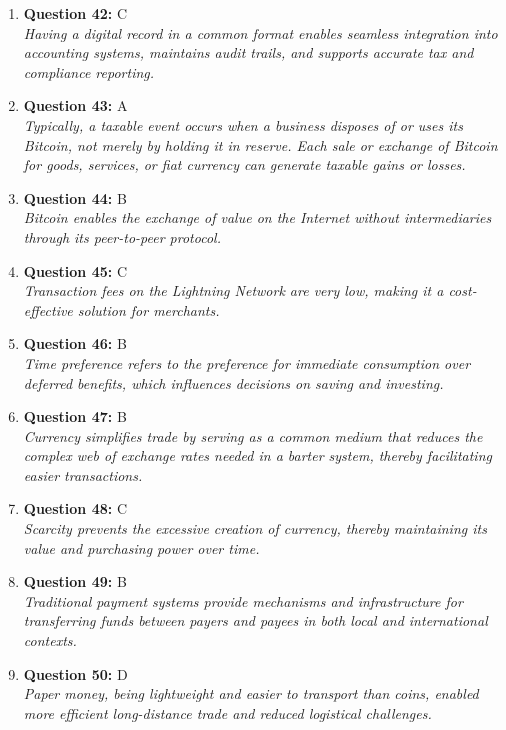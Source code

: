 \documentclass[12pt,a4paper]{article}
\begin{document}
\begin{enumerate}
\item \textbf{Question 42:} C
\\ \textit{Having a digital record in a common format enables seamless integration into accounting systems, maintains audit trails, and supports accurate tax and compliance reporting.}

\item \textbf{Question 43:} A
\\ \textit{Typically, a taxable event occurs when a business disposes of or uses its Bitcoin, not merely by holding it in reserve. Each sale or exchange of Bitcoin for goods, services, or fiat currency can generate taxable gains or losses.}

\item \textbf{Question 44:} B
\\ \textit{Bitcoin enables the exchange of value on the Internet without intermediaries through its peer-to-peer protocol.}

\item \textbf{Question 45:} C
\\ \textit{Transaction fees on the Lightning Network are very low, making it a cost-effective solution for merchants.}

\item \textbf{Question 46:} B
\\ \textit{Time preference refers to the preference for immediate consumption over deferred benefits, which influences decisions on saving and investing.}

\item \textbf{Question 47:} B
\\ \textit{Currency simplifies trade by serving as a common medium that reduces the complex web of exchange rates needed in a barter system, thereby facilitating easier transactions.}

\item \textbf{Question 48:} C
\\ \textit{Scarcity prevents the excessive creation of currency, thereby maintaining its value and purchasing power over time.}

\item \textbf{Question 49:} B
\\ \textit{Traditional payment systems provide mechanisms and infrastructure for transferring funds between payers and payees in both local and international contexts.}

\item \textbf{Question 50:} D
\\ \textit{Paper money, being lightweight and easier to transport than coins, enabled more efficient long-distance trade and reduced logistical challenges.}


\end{enumerate}
\end{document}
